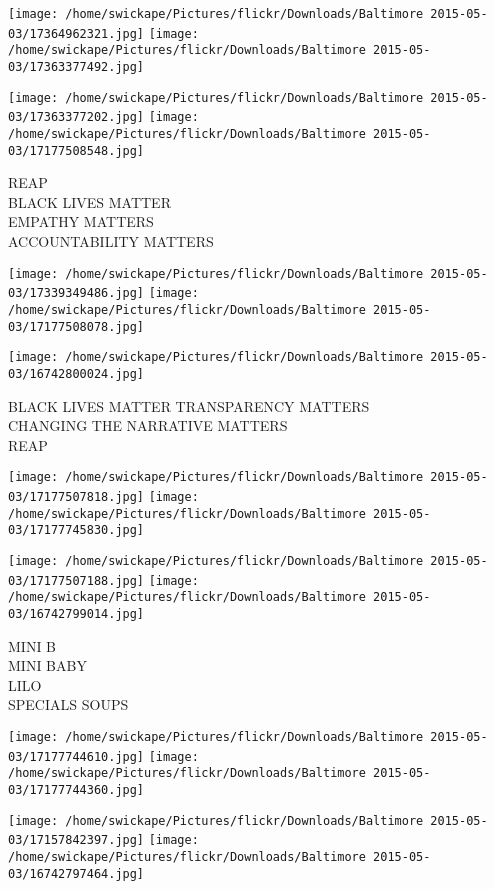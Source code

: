 \documentclass[10pt,letterpaper]{article}
\begin{document}
\texttt{[image: /home/swickape/Pictures/flickr/Downloads/Baltimore 2015-05-03/17364962321.jpg]}
\texttt{[image: /home/swickape/Pictures/flickr/Downloads/Baltimore 2015-05-03/17363377492.jpg]}

\texttt{[image: /home/swickape/Pictures/flickr/Downloads/Baltimore 2015-05-03/17363377202.jpg]}
\texttt{[image: /home/swickape/Pictures/flickr/Downloads/Baltimore 2015-05-03/17177508548.jpg]}

REAP\\
BLACK LIVES MATTER\\
EMPATHY MATTERS\\
ACCOUNTABILITY MATTERS\\
\pagebreak

\texttt{[image: /home/swickape/Pictures/flickr/Downloads/Baltimore 2015-05-03/17339349486.jpg]}
\texttt{[image: /home/swickape/Pictures/flickr/Downloads/Baltimore 2015-05-03/17177508078.jpg]}

\vspace{0.25in}
\texttt{[image: /home/swickape/Pictures/flickr/Downloads/Baltimore 2015-05-03/16742800024.jpg]}

BLACK LIVES MATTER TRANSPARENCY MATTERS\\
CHANGING THE NARRATIVE MATTERS\\
REAP\\
\pagebreak

\texttt{[image: /home/swickape/Pictures/flickr/Downloads/Baltimore 2015-05-03/17177507818.jpg]}
\texttt{[image: /home/swickape/Pictures/flickr/Downloads/Baltimore 2015-05-03/17177745830.jpg]}

\texttt{[image: /home/swickape/Pictures/flickr/Downloads/Baltimore 2015-05-03/17177507188.jpg]}
\texttt{[image: /home/swickape/Pictures/flickr/Downloads/Baltimore 2015-05-03/16742799014.jpg]}

MINI B\\
MINI BABY\\
LILO\\
SPECIALS SOUPS\\
\pagebreak

\texttt{[image: /home/swickape/Pictures/flickr/Downloads/Baltimore 2015-05-03/17177744610.jpg]}
\texttt{[image: /home/swickape/Pictures/flickr/Downloads/Baltimore 2015-05-03/17177744360.jpg]}

\texttt{[image: /home/swickape/Pictures/flickr/Downloads/Baltimore 2015-05-03/17157842397.jpg]}
\texttt{[image: /home/swickape/Pictures/flickr/Downloads/Baltimore 2015-05-03/16742797464.jpg]}
\end{document}
